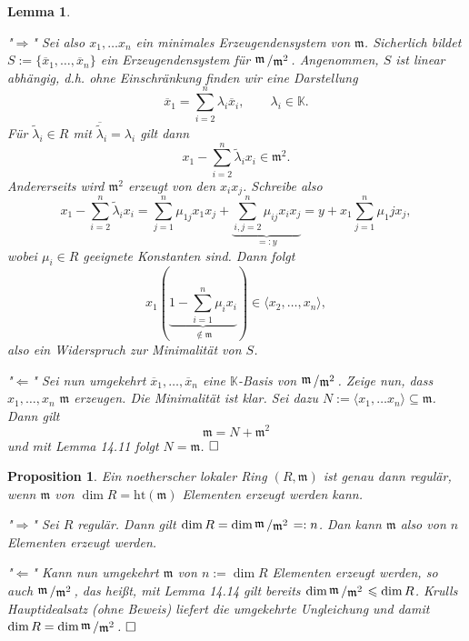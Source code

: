 \documentclass[11pt]{book}
\newtheorem{lemma}[theorem]{Lemma}
\newtheorem{prop}[theorem]{Proposition}
\theoremstyle{nonumberbreak}
\newenvironment{pr}[1][]{\ifthenelse{\equal{#1}{}}{\proof}{\proof[#1]}\rm}{\endproof}
\newcommand{\slant}[2]{{\raisebox{.1em}{$#1$}\left/\raisebox{-.1em}{$#2$}\right.}}
\begin{document}
\begin{spacing}{1.3}
\begin{lemma}
\begin{pr}
\begin{compactenum}
\item["$\Rightarrow$"] Sei also $x_1, \ldots x_n$ ein minimales Erzeugendensystem von $\mathfrak{m}$. Sicherlich bildet $S:=\{\overline{x}_1, \ldots, \overline{x}_n\}$ ein Erzeugendensystem für $\slant{\mathfrak{m}}{\mathfrak{m}^2}$. Angenommen, $S$ ist linear abhängig, d.h. ohne Einschränkung finden wir eine Darstellung
$$\overline{x}_1 = \sum_{i=2}^n \lambda_i \overline{x}_i, \qquad \lambda_i \in \mathbb{K}.$$
Für $\tilde{\lambda}_i \in R$ mit $\overline{\tilde{\lambda}}_i = \lambda_i$ gilt dann
$$x_1 - \sum_{i=2}^n \tilde{\lambda}_i x_i \in \mathfrak{m}^2.$$
Andererseits wird $\mathfrak{m}^2$ erzeugt von den $x_i x_j$. Schreibe also
$$x_1 - \sum_{i=2}^n \tilde{\lambda}_i x_i = \sum_{j=1}^n \mu_{1j} x_1 x_j + \underbrace{\sum_{i,j=2}^n \mu_{ij} x_i x_j}_{=: y} = y+ x_1 \sum_{j=1}^n \mu_1j x_j ,$$
wobei $\mu_i \in R$ geeignete Konstanten sind. Dann folgt
$$x_1 \left( \underbrace{ 1 - \sum_{i=1}^n \mu_i x_i}_{\notin \mathfrak{m}} \right) \in \langle x_2, \ldots, x_n \rangle,$$
also ein Widerspruch zur Minimalität von $S$.

\item["$\Leftarrow$"] Sei nun umgekehrt $\overline{x}_1, \ldots, \overline{x}_n$ eine $\mathbb{K}$-Basis von $\slant{\mathfrak{m}}{\mathfrak{m}^2}$. Zeige nun, dass $x_1, \ldots, x_n$ $\mathfrak{m}$ erzeugen. Die Minimalität ist klar. Sei dazu $N:= \langle x_1, \ldots x_n \rangle \subseteq \mathfrak{m}$. Dann gilt 
 $$\mathfrak{m} = N + \mathfrak{m}^2$$
 und mit Lemma 14.11 folgt $N= \mathfrak{m}$.  $\hfill \Box$


\end{compactenum}
\end{pr}
\end{lemma}

\begin{prop} %

Ein noetherscher lokaler Ring $(R, \mathfrak{m})$ ist genau dann regulär, wenn $\mathfrak{m}$ von $\dim R = \textrm{ht} ( \mathfrak{m})$ Elementen erzeugt werden kann.
\begin{pr}
\begin{compactenum}
\item["$\Rightarrow$"] Sei $R$ regulär. Dann gilt $\dim R = \dim \slant{\mathfrak{m}}{\mathfrak{m}^2}=:n$. Dan kann $\mathfrak{m}$ also von $n$ Elementen erzeugt werden.
\item["$\Leftarrow$"] Kann nun umgekehrt $\mathfrak{m}$ von $n:= \dim R$ Elementen erzeugt werden, so auch $\slant{\mathfrak{m}}{\mathfrak{m}^2}$, das heißt, mit Lemma 14.14 gilt bereits $\dim \slant{\mathfrak{m}}{\mathfrak{m}^2} \leqslant \dim R$. Krulls Hauptidealsatz (ohne Beweis) liefert die umgekehrte Ungleichung und damit $\dim R = \dim \slant{\mathfrak{m}}{\mathfrak{m}^2}$. $\hfill \Box$
\end{compactenum}
\end{pr}
\end{prop}


\end{spacing}
\end{document}
